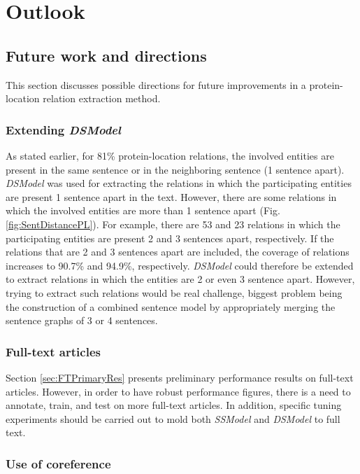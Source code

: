 \chapter{Outlook}\label{chapter:outlook}

\section{Future work and directions}

This section discusses possible directions for future improvements in a protein-location relation extraction method.

\subsection{Extending \textit{DSModel}}

As stated earlier, for 81\% protein-location relations, the involved entities are present in the same sentence or in the neighboring sentence (1 sentence apart). \textit{DSModel} was used for extracting the relations in which the participating entities are present 1 sentence apart in the text. However, there are some relations in which the involved entities are more than 1 sentence apart (Fig. \ref{fig:SentDistancePL}). For example, there are 53 and 23 relations in which the participating entities are present 2 and 3 sentences apart, respectively. If the relations that are 2 and 3 sentences apart are included, the coverage of relations increases to 90.7\% and 94.9\%, respectively. \textit{DSModel} could therefore be extended to extract relations in which the entities are 2 or even 3 sentence apart. However, trying to extract such relations would be real challenge, biggest problem being the construction of a combined sentence model by appropriately merging the sentence graphs of 3 or 4 sentences.

\subsection{Full-text articles}

Section \ref{sec:FTPrimaryRes} presents preliminary performance results on full-text articles. However, in order to have robust performance figures, there is a need to annotate, train, and test on more full-text articles. In addition, specific tuning experiments should be carried out to mold both \textit{SSModel} and \textit{DSModel} to full text.

\subsection{Use of coreference}

